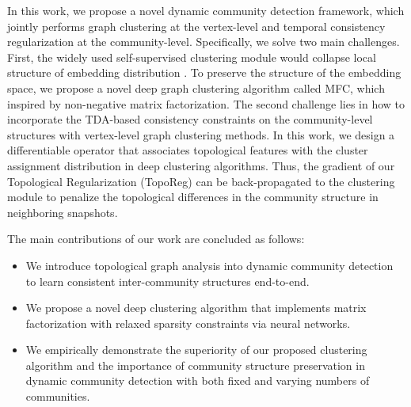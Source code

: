 \documentclass[letterpaper]{article} %
\begin{document}
In this work, we propose  a novel dynamic community detection framework, which jointly performs graph clustering at the vertex-level  and temporal consistency regularization at the community-level.  Specifically, we  solve  two  main challenges. %
First, the widely used self-supervised clustering module \cite{xie2016unsupervisedDEC} would collapse local structure of embedding distribution \cite{IDEC2017}.
To preserve the structure of the embedding space, we propose a novel deep graph clustering algorithm called MFC, which inspired by non-negative matrix factorization.
The second challenge lies in how to incorporate the TDA-based consistency constraints on the community-level structures with vertex-level graph clustering methods. In this work, we design a differentiable operator that associates topological features with the cluster assignment distribution in deep clustering algorithms. Thus, the gradient of our Topological Regularization (TopoReg) can be back-propagated to the clustering module to penalize the topological differences in the community structure in neighboring snapshots. 
  
The main contributions of our work are concluded as follows:
\begin{itemize}
    \item We introduce topological graph analysis into dynamic community detection to learn consistent inter-community structures end-to-end.
    \item We propose a novel deep clustering algorithm that implements matrix factorization with relaxed sparsity constraints via neural networks.
    \item We empirically demonstrate the superiority of our proposed clustering algorithm and the importance of community structure preservation in dynamic community detection with both fixed and varying numbers of communities.
\end{itemize}
\end{document}
